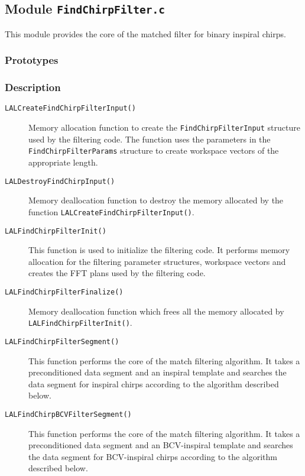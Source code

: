\subsection{Module \texttt{FindChirpFilter.c}}
\label{ss:FindChirpFilter.c}

This module provides the core of the matched filter for binary inspiral
chirps.

\subsubsection*{Prototypes}
\vspace{0.1in}


\subsubsection*{Description}

\begin{description}
\item[\texttt{LALCreateFindChirpFilterInput()}] Memory allocation function to
create the \texttt{FindChirpFilterInput} structure used by the filtering code.
The function uses the parameters in the \texttt{FindChirpFilterParams}
structure to create workspace vectors of the appropriate length.

\item[\texttt{LALDestroyFindChirpInput()}] Memory deallocation function to
destroy the memory allocated by the function
\texttt{LALCreateFindChirpFilterInput()}.

\item[\texttt{LALFindChirpFilterInit()}] This function is used to initialize
the filtering code. It performs memory allocation for the filtering parameter
structures, workspace vectors and creates the FFT plans used by the filtering
code.

\item[\texttt{LALFindChirpFilterFinalize()}] Memory deallocation function
which frees all the memory allocated by \texttt{LALFindChirpFilterInit()}.

\item[\texttt{LALFindChirpFilterSegment()}] This function performs the core of
the match filtering algorithm. It takes a preconditioned data segment and an
inspiral template and searches the data segment for inspiral chirps according
to the algorithm described below.

\item[\texttt{LALFindChirpBCVFilterSegment()}] This function performs the core 
of the match filtering algorithm. It takes a preconditioned data segment and an
BCV-inspiral template and searches the data segment for BCV-inspiral chirps 
according to the algorithm described below.

\end{description}

